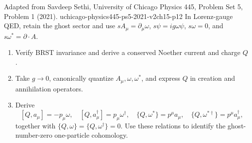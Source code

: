 \begin{enumerate}
  {Adapted from Savdeep Sethi, University of Chicago Physics 445, Problem Set 5, Problem 1 (2021).}
  {uchicago-physics445-ps5-2021-v2ch15-p12}
  In Lorenz-gauge QED, retain the ghost sector and use
  \(sA_\mu=\partial_\mu\omega\), \(s\psi=ig\omega\psi\),
  \(s\omega=0\), and \(s\omega^*=\partial\cdot A\).
  \begin{enumerate}
    \item[(a)] Verify BRST invariance and derive a conserved Noether current
      and charge \(Q\).
    \item[(b)] Take \(g\to0\), canonically quantize \(A_\mu,\omega,\omega^*\),
      and express \(Q\) in creation and annihilation operators.
    \item[(c)] Derive
      \[
      [Q,a_\mu]=-p_\mu\omega,\quad
      [Q,a_\mu^\dagger]=p_\mu\omega^\dagger,\quad
      \{Q,\omega^*\}=p^\mu a_\mu,\quad
      \{Q,\omega^{*\dagger}\}=p^\mu a_\mu^\dagger,
      \]
      together with
      \(\{Q,\omega\}=\{Q,\omega^\dagger\}=0\).
      Use these relations to identify the ghost-number-zero one-particle
      cohomology.
  \end{enumerate}


\end{enumerate}
